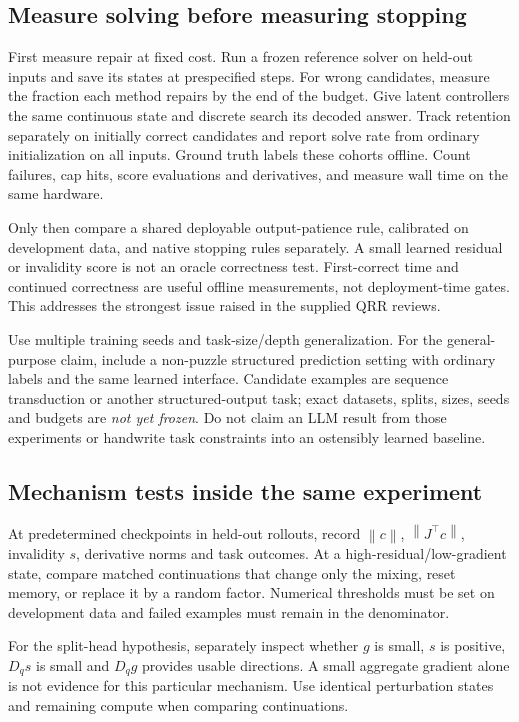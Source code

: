 \documentclass[11pt,a4paper]{article}
\newcommand{\norm}[1]{\left\lVert #1\right\rVert}
\begin{document}
\subsection{Measure solving before measuring stopping}
First measure repair at fixed cost. Run a frozen reference solver on held-out inputs and save its states at prespecified steps. For wrong candidates, measure the fraction each method repairs by the end of the budget. Give latent controllers the same continuous state and discrete search its decoded answer. Track retention separately on initially correct candidates and report solve rate from ordinary initialization on all inputs. Ground truth labels these cohorts offline. Count failures, cap hits, score evaluations and derivatives, and measure wall time on the same hardware.

Only then compare a shared deployable output-patience rule, calibrated on development data, and native stopping rules separately. A small learned residual or invalidity score is not an oracle correctness test. First-correct time and continued correctness are useful offline measurements, not deployment-time gates. This addresses the strongest issue raised in the supplied QRR reviews.

Use multiple training seeds and task-size/depth generalization. For the general-purpose claim, include a non-puzzle structured prediction setting with ordinary labels and the same learned interface. Candidate examples are sequence transduction or another structured-output task; exact datasets, splits, sizes, seeds and budgets are \emph{not yet frozen}. Do not claim an LLM result from those experiments or handwrite task constraints into an ostensibly learned baseline.

\subsection{Mechanism tests inside the same experiment}
At predetermined checkpoints in held-out rollouts, record $\norm{c}$, $\norm{J^\top c}$, invalidity $s$, derivative norms and task outcomes. At a high-residual/low-gradient state, compare matched continuations that change only the mixing, reset memory, or replace it by a random factor. Numerical thresholds must be set on development data and failed examples must remain in the denominator.

For the split-head hypothesis, separately inspect whether $g$ is small, $s$ is positive, $D_qs$ is small and $D_qg$ provides usable directions. A small aggregate gradient alone is not evidence for this particular mechanism. Use identical perturbation states and remaining compute when comparing continuations.
\end{document}
